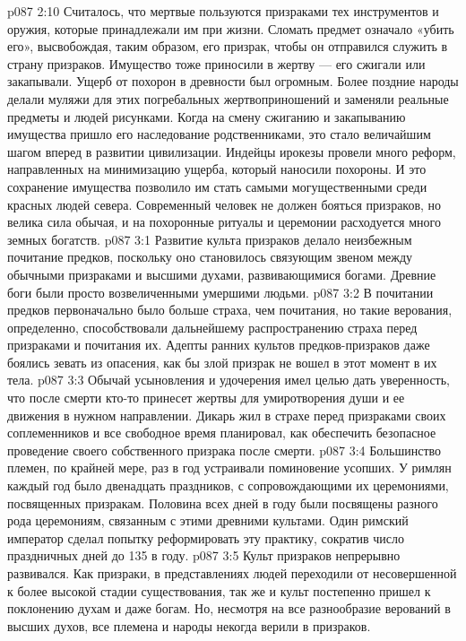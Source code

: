 \vs p087 2:10 Считалось, что мертвые пользуются призраками тех инструментов и оружия, которые принадлежали им при жизни. Сломать предмет означало «убить его», высвобождая, таким образом, его призрак, чтобы он отправился служить в страну призраков. Имущество тоже приносили в жертву --- его сжигали или закапывали. Ущерб от похорон в древности был огромным. Более поздние народы делали муляжи для этих погребальных жертвоприношений и заменяли реальные предметы и людей рисунками. Когда на смену сжиганию и закапыванию имущества пришло его наследование родственниками, это стало величайшим шагом вперед в развитии цивилизации. Индейцы ирокезы провели много реформ, направленных на минимизацию ущерба, который наносили похороны. И это сохранение имущества позволило им стать самыми могущественными среди красных людей севера. Современный человек не должен бояться призраков, но велика сила обычая, и на похоронные ритуалы и церемонии расходуется много земных богатств.
\vs p087 3:1 Развитие культа призраков делало неизбежным почитание предков, поскольку оно становилось связующим звеном между обычными призраками и высшими духами, развивающимися богами. Древние боги были просто возвеличенными умершими людьми.
\vs p087 3:2 В почитании предков первоначально было больше страха, чем почитания, но такие верования, определенно, способствовали дальнейшему распространению страха перед призраками и почитания их. Адепты ранних культов предков\hyp{}призраков даже боялись зевать из опасения, как бы злой призрак не вошел в этот момент в их тела.
\vs p087 3:3 Обычай усыновления и удочерения имел целью дать уверенность, что после смерти кто\hyp{}то принесет жертвы для умиротворения души и ее движения в нужном направлении. Дикарь жил в страхе перед призраками своих соплеменников и все свободное время планировал, как обеспечить безопасное проведение своего собственного призрака после смерти.
\vs p087 3:4 Большинство племен, по крайней мере, раз в год устраивали поминовение усопших. У римлян каждый год было двенадцать праздников, с сопровождающими их церемониями, посвященных призракам. Половина всех дней в году были посвящены разного рода церемониям, связанным с этими древними культами. Один римский император сделал попытку реформировать эту практику, сократив число праздничных дней до 135 в году.
\vs p087 3:5 \pc Культ призраков непрерывно развивался. Как призраки, в представлениях людей переходили от несовершенной к более высокой стадии существования, так же и культ постепенно пришел к поклонению духам и даже богам. Но, несмотря на все разнообразие верований в высших духов, все племена и народы некогда верили в призраков.
